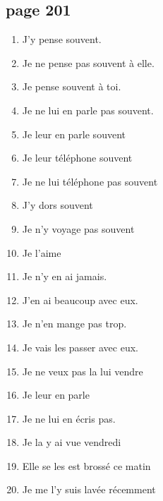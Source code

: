 \documentclass[letterpaper]{article}
\begin{document}
\doublespacing
\subsection*{page 201}
\begin{enumerate}
  \item
  J'y pense souvent.
  \item
  Je ne pense pas souvent à elle.
  \item
  Je pense souvent à toi.
  \item
  Je ne lui en parle pas souvent.
  \item
  Je leur en parle souvent
  \item
  Je leur téléphone souvent
  \item
  Je ne lui téléphone pas souvent
  \item
  J'y dors souvent
  \item
  Je n'y voyage pas souvent
  \item
  Je l'aime 
  \item
  Je n'y en ai jamais.
  \item
  J'en ai beaucoup avec eux.
  \item
  Je n'en mange pas trop.
  \item
  Je vais les passer avec eux.
  \item
  Je ne veux pas la lui vendre
  \item
  Je leur en parle
  \item
  Je ne lui en écris pas.
  \item
  Je la y ai vue vendredi
  \item
  Elle se les est brossé ce matin
  \item
  Je me l'y suis lavée récemment
\end{enumerate}
\end{document}
